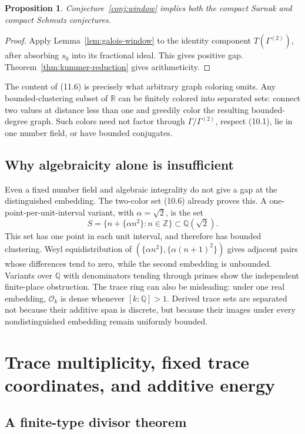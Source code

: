 \documentclass[11pt,reqno]{amsart}
\newtheorem{proposition}[theorem]{Proposition}
\theoremstyle{definition}
\theoremstyle{remark}
\newcommand{\R}{\mathbb R}
\newcommand{\Q}{\mathbb Q}
\newcommand{\Z}{\mathbb Z}
\newcommand{\cO}{\mathcal O}
\begin{document}
\begin{proposition}
Conjecture~\ref{conj:window} implies both the compact Sarnak and compact
Schmutz conjectures.
\end{proposition}

\begin{proof}
Apply Lemma~\ref{lem:galois-window} to the identity component
\(T(\Gamma^{(2)})\), after absorbing \(s_0\) into its fractional ideal.  This
gives positive gap.  Theorem~\ref{thm:kummer-reduction} gives arithmeticity.
\end{proof}

The content of (11.6) is precisely what arbitrary graph coloring omits.  Any
bounded-clustering subset of \(\R\) can be finitely colored into separated
sets: connect two values at distance less than one and greedily color the
resulting bounded-degree graph.  Such colors need not factor through
\(\Gamma/\Gamma^{(2)}\), respect (10.1), lie in one number field, or have
bounded conjugates.

\subsection{Why algebraicity alone is insufficient}

Even a fixed number field and algebraic integrality do not give a gap at the
distinguished embedding.
The two-color set (10.6) already proves this.  A one-point-per-unit-interval
variant, with \(\alpha=\sqrt2\), is the set
\[
 S=\{n+\{\alpha n^2\}:n\in\Z\}\subset\Q(\sqrt2).
\]
This set has one point in each unit interval, and therefore has bounded
clustering.
Weyl equidistribution of
\((\{\alpha n^2\},\{\alpha(n+1)^2\})\) gives adjacent pairs whose
differences tend to zero, while the second embedding is unbounded.  Variants
over \(\Q\) with denominators
tending through primes show the independent finite-place obstruction.  The
trace ring can also be misleading: under one real embedding, \(\cO_k\) is
dense whenever \([k:\Q]>1\).  Derived trace sets are separated not because
their additive span is discrete, but because their images under every
nondistinguished embedding remain uniformly bounded.

\section{Trace multiplicity, fixed trace coordinates, and additive energy}

\subsection{A finite-type divisor theorem}
\end{document}
